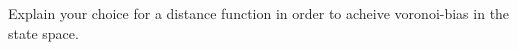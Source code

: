 \question{[5]}

Explain your choice for a distance function in order to acheive voronoi-bias
in the state space.